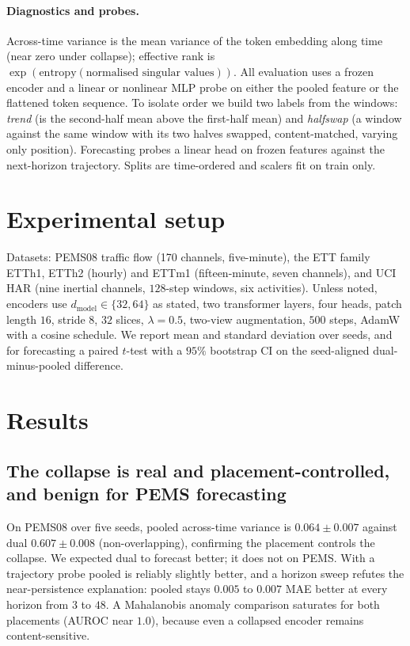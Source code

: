 \documentclass[11pt]{article}
\begin{document}
\paragraph{Diagnostics and probes.} Across-time variance is the mean variance of the token
embedding along time (near zero under collapse); effective rank \citep{effrank2007} is
$\exp(\mathrm{entropy}(\text{normalised singular values}))$. All evaluation uses a frozen encoder
and a linear or nonlinear MLP probe on either the pooled feature or the flattened token sequence.
To isolate order we build two labels from the windows: \emph{trend} (is the second-half mean above
the first-half mean) and \emph{halfswap} (a window against the same window with its two halves
swapped, content-matched, varying only position). Forecasting probes a linear head on frozen
features against the next-horizon trajectory. Splits are time-ordered and scalers fit on train
only.

\section{Experimental setup}

Datasets: PEMS08 traffic flow \citep{astgcn2019} (170 channels, five-minute), the ETT family
\citep{informer2021} ETTh1, ETTh2 (hourly) and ETTm1 (fifteen-minute, seven channels), and UCI HAR
\citep{ucihar2013} (nine inertial channels, $128$-step windows, six activities). Unless noted,
encoders use $d_{\text{model}}\in\{32,64\}$ as stated, two transformer layers, four heads, patch
length $16$, stride $8$, $32$ slices, $\lambda=0.5$, two-view augmentation, $500$ steps, AdamW with
a cosine schedule. We report mean and standard deviation over seeds, and for forecasting a paired
$t$-test with a $95\%$ bootstrap CI on the seed-aligned dual-minus-pooled difference.

\section{Results}

\subsection{The collapse is real and placement-controlled, and benign for PEMS forecasting}

On PEMS08 over five seeds, pooled across-time variance is $0.064\pm0.007$ against dual
$0.607\pm0.008$ (non-overlapping), confirming the placement controls the collapse. We expected dual
to forecast better; it does not on PEMS. With a trajectory probe pooled is reliably slightly better,
and a horizon sweep refutes the near-persistence explanation: pooled stays $0.005$ to $0.007$ MAE
better at every horizon from $3$ to $48$. A Mahalanobis anomaly comparison saturates for both
placements (AUROC near $1.0$), because even a collapsed encoder remains content-sensitive.
\end{document}
